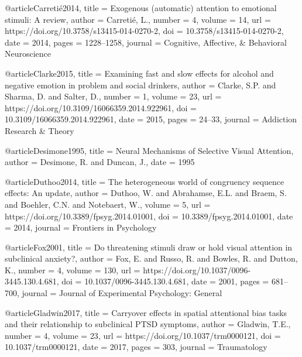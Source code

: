 @article{Carretié2014,
    title       = {Exogenous (automatic) attention to emotional stimuli: A review},
    author      = {Carretié, L.},
    number      = {4},
    volume      = {14},
    url         = {https://doi.org/10.3758/s13415-014-0270-2},
    doi         = {10.3758/s13415-014-0270-2},
    date        = {2014},
    pages       = {1228–1258},
    journal     = {Cognitive, Affective, & Behavioral Neuroscience}
}


@article{Clarke2015,
    title       = {Examining fast and slow effects for alcohol and negative emotion in problem and social drinkers},
    author      = {Clarke, S.P. and Sharma, D. and Salter, D.},
    number      = {1},
    volume      = {23},
    url         = {https://doi.org/10.3109/16066359.2014.922961},
    doi         = {10.3109/16066359.2014.922961},
    date        = {2015},
    pages       = {24–33},
    journal     = {Addiction Research & Theory}
}


@article{Desimone1995,
    title       = {Neural Mechanisms of Selective Visual Attention},
    author      = {Desimone, R. and Duncan, J.},
    date        = {1995}
}


@article{Duthoo2014,
    title       = {The heterogeneous world of congruency sequence effects: An update},
    author      = {Duthoo, W. and Abrahamse, E.L. and Braem, S. and Boehler, C.N. and Notebaert, W.},
    volume      = {5},
    url         = {https://doi.org/10.3389/fpsyg.2014.01001},
    doi         = {10.3389/fpsyg.2014.01001},
    date        = {2014},
    journal     = {Frontiers in Psychology}
}


@article{Fox2001,
    title       = {Do threatening stimuli draw or hold visual attention in subclinical anxiety?},
    author      = {Fox, E. and Russo, R. and Bowles, R. and Dutton, K.},
    number      = {4},
    volume      = {130},
    url         = {https://doi.org/10.1037/0096-3445.130.4.681},
    doi         = {10.1037/0096-3445.130.4.681},
    date        = {2001},
    pages       = {681–700},
    journal     = {Journal of Experimental Psychology: General}
}


@article{Gladwin2017,
    title       = {Carryover effects in spatial attentional bias tasks and their relationship to subclinical PTSD symptoms},
    author      = {Gladwin, T.E.},
    number      = {4},
    volume      = {23},
    url         = {https://doi.org/10.1037/trm0000121},
    doi         = {10.1037/trm0000121},
    date        = {2017},
    pages       = {303},
    journal     = {Traumatology}
}


